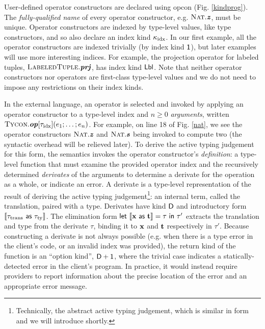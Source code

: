 \documentclass[9pt,preprint]{sigplanconf}
\begin{document}
User-defined operator constructors are declared using \textsf{opcon} (Fig. \ref{kindprog}). The \emph{fully-qualified name} of every operator constructor, e.g. $\textsc{Nat}.\textbf{\textit{z}}$, must be unique. Operator constructors are indexed by type-level values, like type constructors, and so also declare an index kind $\kappa_{\text{idx}}$. In our first example, all the operator constructors are indexed trivially (by index kind $\textsf{1}$), but later examples will use more interesting indices. For example, the projection operator for labeled tuples, $\textsc{LabeledTuple}.\textbf{\textit{prj}}$, has index kind $\textsf{Lbl}$.
Note that neither operator constructors nor operators are first-class type-level values and we do not need to impose any restrictions on their index kinds.

In the external language, an operator is selected and invoked by applying an operator constructor to a type-level index and $n \geq 0$ \emph{arguments}, written ${\textsc{Tycon}.\textbf{\textit{op}}[{\tau_{\text{idx}}}](e_{1};\ldots;e_{n})}$. For example, on line 18 of Fig. \ref{nat}, we see the operator constructors $\textsc{Nat}.\textbf{\textit{z}}$ and $\textsc{Nat}.\textbf{\textit{s}}$ being invoked to compute two (the syntactic overhead will be relieved later). %
To derive the active typing judgement for this form, the semantics invokes  
 the operator constructor's  \emph{definition}: a type-level function that must examine the provided operator index and the recursively determined \emph{derivates} of the arguments to determine a derivate for the operation as a whole,  or indicate an error. A derivate is a type-level representation of the result of deriving the active typing judgement\footnote{Technically, the abstract active typing judgement, which is similar in form and we will introduce shortly.}: an internal term, called the {translation},  paired with a type. Derivates have kind $\textsf{D}$ and introductory form $\llbracket {\tau_{\text{trans}}}~{\sf as}~{\tau_{\text{ty}}} \rrbracket$. The elimination form ${\sf let}~\llbracket {\textbf{x}}~{\sf as}~{\textbf{t}} \rrbracket=\tau~{\sf in}~\tau'$ extracts the translation and type from the derivate $\tau$, binding it to ${\textbf{x}}$ and ${\textbf{t}}$ respectively in $\tau'$. 
Because constructing a derivate is not always possible (e.g. when there is a type error in the client's code, or an invalid index was provided), the return kind of the function is an ``option kind'', $\textsf{D} + \textsf{1}$, where the trivial case indicates a statically-detected error in the client's program. In practice, it would instead require providers to report information about the precise location of the error and an appropriate error message.
 
\end{document}
